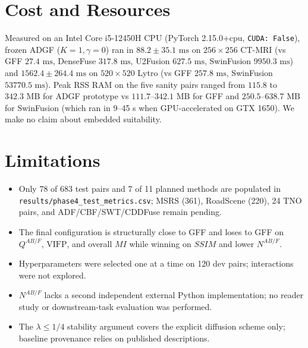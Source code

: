 \documentclass[conference]{IEEEtran}
\begin{document}
\section{Cost and Resources}
Measured on an Intel Core i5-12450H CPU (PyTorch 2.15.0+cpu, \texttt{CUDA: False}), frozen ADGF ($K=1, \gamma=0$) ran in $88.2\pm 35.1\text{ ms}$ on $256\times 256$ CT-MRI (vs GFF $27.4\text{ ms}$, DenseFuse $317.8\text{ ms}$, U2Fusion $627.5\text{ ms}$, SwinFusion $9950.3\text{ ms}$) and $1562.4\pm 264.4\text{ ms}$ on $520\times 520$ Lytro (vs GFF $257.8\text{ ms}$, SwinFusion $53770.5\text{ ms}$). Peak RSS RAM on the five sanity pairs ranged from $115.8$ to $342.3\text{ MB}$ for ADGF prototype vs $111.7$--$342.1\text{ MB}$ for GFF and $250.5$--$638.7\text{ MB}$ for SwinFusion (which ran in 9--45 s when GPU-accelerated on GTX 1650). We make no claim about embedded suitability.

\section{Limitations}
\begin{itemize}
    \item Only 78 of 683 test pairs and 7 of 11 planned methods are populated in \texttt{results/phase4\_test\_metrics.csv}; MSRS (361), RoadScene (220), 24 TNO pairs, and ADF/CBF/SWT/CDDFuse remain pending.
    \item The final configuration is structurally close to GFF and loses to GFF on $Q^{AB/F}$, $\mathrm{VIFP}$, and overall $MI$ while winning on $SSIM$ and lower $N^{AB/F}$.
    \item Hyperparameters were selected one at a time on 120 dev pairs; interactions were not explored.
    \item $N^{AB/F}$ lacks a second independent external Python implementation; no reader study or downstream-task evaluation was performed.
    \item The $\lambda \le 1/4$ stability argument covers the explicit diffusion scheme only; baseline provenance relies on published descriptions.
\end{itemize}
\end{document}
